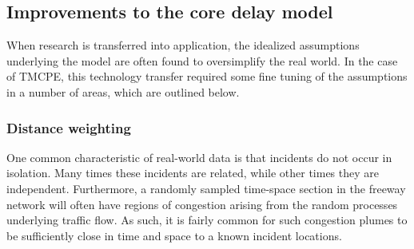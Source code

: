 \documentclass[12pt]{report}
\renewcommand{\fixme}[3][]{#1\xspace}
\newcounter{time}
\newcounter{space}
\begin{document}

\subsection{Improvements to the core delay model}
\label{sec:delay-improvements}

When research is transferred into application, the idealized
assumptions underlying the model are often found to oversimplify the
real world.  In the case of \ac{TMCPE}, this technology transfer required
some fine tuning of the assumptions in a number of areas, which are
outlined below.





\subsubsection{Distance weighting}
\label{sec:dist-weight}

One common characteristic of real-world data is that incidents do not
occur in isolation.  Many times these incidents are related, while
other times they are independent.  Furthermore, a randomly sampled
time-space section in the freeway network will often have regions of
congestion arising from the random processes underlying traffic flow.
As such, it is fairly common for such congestion plumes to be
sufficiently close in time and space to a known incident locations.
\end{document}
